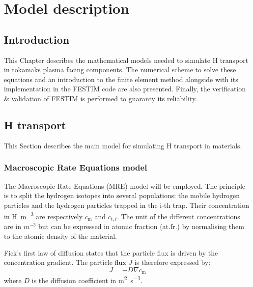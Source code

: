 \setchapterpreamble[u]{\margintoc}
\chapter{Model description}
\label{Chapter2} %
\section{Introduction}
This Chapter describes the mathematical models needed to simulate H transport in tokamaks plasma facing components.
The numerical scheme to solve these equations and an introduction to the finite element method alongside with its implementation in the FESTIM code are also presented.
Finally, the verification \& validation of FESTIM is performed to guaranty its reliability.

\section{H transport} \label{description_H_transport_model}

This Section describes the main model for simulating H transport in materials.

\subsection{Macroscopic Rate Equations model}

The Macroscopic Rate Equations (MRE) model will be employed.
The principle is to split the hydrogen isotopes into several populations: the mobile hydrogen particles and the hydrogen particles trapped in the i-th trap.
Their concentration in \si{H.m^{-3}} are respectively $c_\mathrm{m}$ and $c_{\mathrm{t},i}$.
The unit of the different concentrations are in $ \si{m^{-3}}$ but can be expressed in atomic fraction (at.fr.) by normalising them to the atomic density of the material.

Fick's first law of diffusion states that the particle flux is driven by the concentration gradient.
The particle flux $J$ is therefore expressed by:
\begin{equation}
    J = - D \nabla c_\mathrm{m}
\end{equation}
where $D$ is the diffusion coefficient in \si{m^2.s^{-1}}. 


